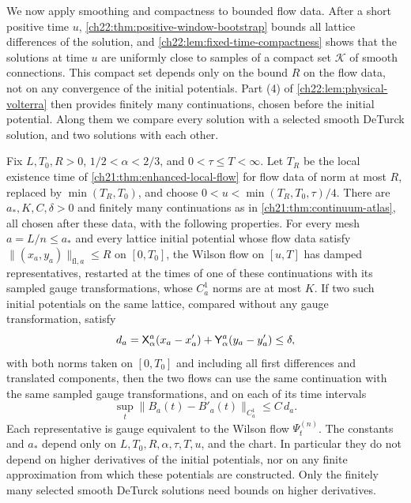 We now apply smoothing and compactness to bounded flow data. After a short positive time $u$, \cref{ch22:thm:positive-window-bootstrap} bounds all lattice differences of the solution, and \cref{ch22:lem:fixed-time-compactness} shows that the solutions at time $u$ are uniformly close to samples of a compact set $\mathscr K$ of smooth connections. This compact set depends only on the bound $R$ on the flow data, not on any convergence of the initial potentials. Part (4) of \cref{ch22:lem:physical-volterra} then provides finitely many continuations, chosen before the initial potential. Along them we compare every solution with a selected smooth DeTurck solution, and two solutions with each other.

\begin{lemma}\label{ch22:lem:bounded-input-continuation}
Fix $L,T_0,R>0$, $1/2<\alpha<2/3$, and $0<\tau\le T<\infty$. Let $T_R$ be the local existence time of \cref{ch21:thm:enhanced-local-flow} for flow data of norm at most $R$, replaced by $\min(T_R,T_0)$, and choose $0<u<\min(T_R,T_0,\tau)/4$. There are $a_*,K,C,\delta>0$ and finitely many continuations as in \cref{ch21:thm:continuum-atlas}, all chosen after these data, with the following properties. For every mesh $a=L/n\le a_*$ and every lattice initial potential whose flow data satisfy $\|(x_a,y_a)\|_{\mathrm{fl},a}\le R$ on $[0,T_0]$, the Wilson flow on $[u,T]$ has damped representatives, restarted at the times of one of these continuations with its sampled gauge transformations, whose $C_a^1$ norms are at most $K$. If two such initial potentials on the same lattice, compared without any gauge transformation, satisfy
\[
 d_a=\mathsf X_{\alpha}^{a}(x_a-x'_a)+\mathsf Y_{\alpha}^{a}(y_a-y'_a)\le\delta,
\]
with both norms taken on $[0,T_0]$ and including all first differences and translated components, then the two flows can use the same continuation with the same sampled gauge transformations, and on each of its time intervals
\[
 \sup_t\|B_a(t)-B'_a(t)\|_{C_a^1}\le C\,d_a .
\]
Each representative is gauge equivalent to the Wilson flow $\Psi^{(n)}_t$. The constants and $a_*$ depend only on $L,T_0,R,\alpha,\tau,T,u$, and the chart. In particular they do not depend on higher derivatives of the initial potentials, nor on any finite approximation from which these potentials are constructed. Only the finitely many selected smooth DeTurck solutions need bounds on higher derivatives.
\end{lemma}

